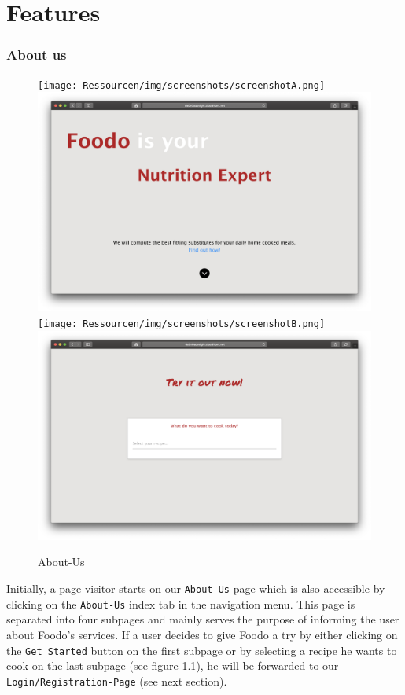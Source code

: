 \chapter{Features}
\vspace{-2em}
\subsection*{About us}
\vspace{0.5em}
\begin{figure}[H]
	\captionsetup{justification=centering}
	\begin{center}
		\texttt{[image: Ressourcen/img/screenshots/screenshotA.png]}\hfill
		\includegraphics[scale=0.146]{Ressourcen/img/screenshots/About2.png}\hfill
		\texttt{[image: Ressourcen/img/screenshots/screenshotB.png]}\hfill
		\includegraphics[scale=0.14]{Ressourcen/img/screenshots/screenshotC.png}
		\vspace{-1em}
		\caption{About-Us}
		\label{fig:aboutus}
	\end{center}
\end{figure}
\vspace{-3em}
Initially, a page visitor starts on our \texttt{About-Us} page which is also accessible by clicking on the \texttt{About-Us} index tab in the navigation menu. This page is separated into four subpages and mainly serves the purpose of informing the user about Foodo's services. If a user decides to give Foodo a try by either clicking on the \texttt{Get Started} button on the first subpage or by selecting a recipe he wants to cook on the last subpage (see figure \ref{fig:aboutus}), he will be forwarded to our \texttt{Login/Registration-Page} (see next section).
